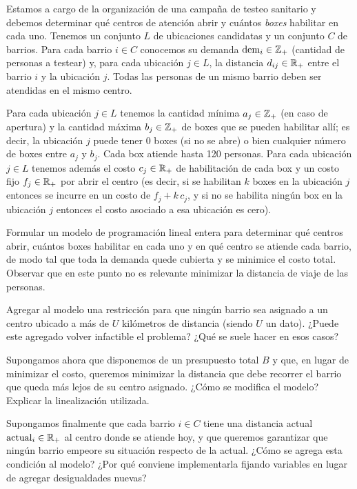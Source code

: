 \documentclass[11pt,a4paper]{article}
\begin{document}
\newpage
Estamos a cargo de la organización de una campaña de testeo sanitario y debemos
determinar qué centros de atención abrir y cuántos \emph{boxes} habilitar en cada
uno. Tenemos un conjunto $L$ de ubicaciones candidatas y un conjunto $C$ de
barrios. Para cada barrio $i \in C$ conocemos su demanda $\mathrm{dem}_i \in \mathbb{Z}_+$
(cantidad de personas a testear) y, para cada ubicación $j \in L$, la distancia
$d_{ij} \in \mathbb{R}_+$ entre el barrio $i$ y la ubicación $j$. Todas las personas de un
mismo barrio deben ser atendidas en el mismo centro.

Para cada ubicación $j \in L$ tenemos la cantidad mínima $a_j \in \mathbb{Z}_+$
(en caso de apertura) y la cantidad máxima $b_j \in \mathbb{Z}_+$ de boxes que se pueden
habilitar allí; es decir, la ubicación $j$ puede tener 0 boxes (si no se abre) o
bien cualquier número de boxes entre $a_j$ y $b_j$. Cada box atiende hasta 120
personas. Para cada ubicación $j \in L$ tenemos además el costo $c_j \in \mathbb{R}_+$ de
habilitación de cada box y un costo fijo $f_j \in \mathbb{R}_+$ por abrir el centro (es
decir, si se habilitan $k$ boxes en la ubicación $j$ entonces se incurre en un
costo de $f_j + k\,c_j$, y si no se habilita ningún box en la ubicación $j$
entonces el costo asociado a esa ubicación es cero).

\begin{puntos}
  \item Formular un modelo de programación lineal entera para determinar qué
  centros abrir, cuántos boxes habilitar en cada uno y en qué centro se atiende
  cada barrio, de modo tal que toda la demanda quede cubierta y se minimice el
  costo total. Observar que en este punto no es relevante minimizar la distancia
  de viaje de las personas.

  \item Agregar al modelo una restricción para que ningún barrio sea asignado a
  un centro ubicado a más de $U$ kilómetros de distancia (siendo $U$ un dato).
  ¿Puede este agregado volver infactible el problema? ¿Qué se suele hacer en
  esos casos?

  \item Supongamos ahora que disponemos de un presupuesto total $B$ y que, en
  lugar de minimizar el costo, queremos minimizar la distancia que debe recorrer
  el barrio que queda más lejos de su centro asignado. ¿Cómo se modifica el
  modelo? Explicar la linealización utilizada.

  \item Supongamos finalmente que cada barrio $i \in C$ tiene una distancia
  actual $\mathrm{actual}_i \in \mathbb{R}_+$ al centro donde se atiende hoy, y que
  queremos garantizar que ningún barrio empeore su situación respecto de la
  actual. ¿Cómo se agrega esta condición al modelo? ¿Por qué conviene
  implementarla fijando variables en lugar de agregar desigualdades nuevas?
\end{puntos}
\end{document}
